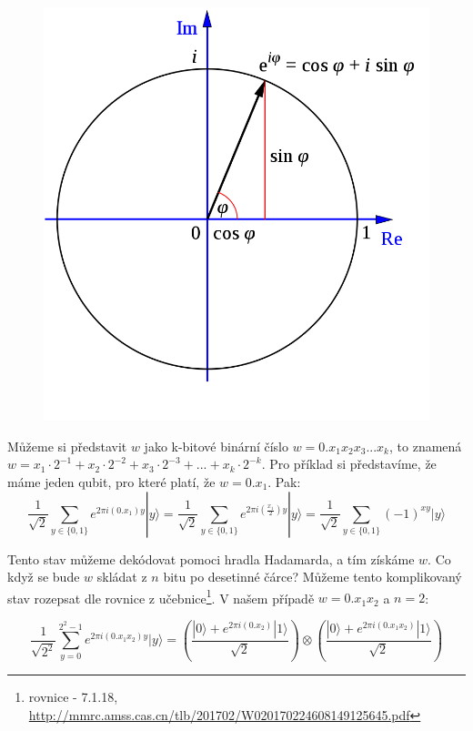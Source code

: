 \documentclass[11pt]{article}
\begin{document}
\begin{figure}[H]
    \includegraphics[scale=.25]{Eulers_formula.png}
    \centering
\end{figure}
\par Můžeme si představit $w$ jako k-bitové binární číslo $w=0.x_1x_2x_3...x_k$, to znamená $w = x_1 \cdot 2^{-1} + x_2 \cdot 2^{-2} + x_3 \cdot 2^{-3} + ... + x_k \cdot 2^{-k}$.
Pro příklad si představíme, že máme jeden qubit, pro které platí, že $w=0.x_1$.
Pak:
$$
    \frac{1}{\sqrt{2}}\displaystyle\sum_{y\in\{0, 1\}} e^{2\pi i (0.x_1) y}|y\rangle =
    \frac{1}{\sqrt{2}}\displaystyle\sum_{y\in\{0, 1\}} e^{2\pi i (\frac{x_1}{2}) y}|y\rangle =
    \frac{1}{\sqrt{2}}\displaystyle\sum_{y\in\{0, 1\}} (-1)^{xy}|y\rangle
$$
\par Tento stav můžeme dekódovat pomoci hradla Hadamarda, a tím získáme $w$.
Co když se bude $w$ skládat z $n$ bitu po desetinné čárce?
Můžeme tento komplikovaný stav rozepsat dle rovnice z učebnice\footnote{rovnice - 7.1.18, \url{http://mmrc.amss.cas.cn/tlb/201702/W020170224608149125645.pdf}}.
V našem případě $w=0.x_1x_2$ a $n=2$:

$$
    \frac{1}{\sqrt{2^2}}\displaystyle\sum_{y=0}^{2^2 - 1} e^{2\pi i (0.x_1x_2) y}|y\rangle =
    \left(\frac{|0\rangle + e^{2\pi i (0.x_2)}|1\rangle}{\sqrt{2}}\right) \otimes
    \left(\frac{|0\rangle + e^{2\pi i (0.x_1x_2)}|1\rangle}{\sqrt{2}}\right)
$$
\end{document}
